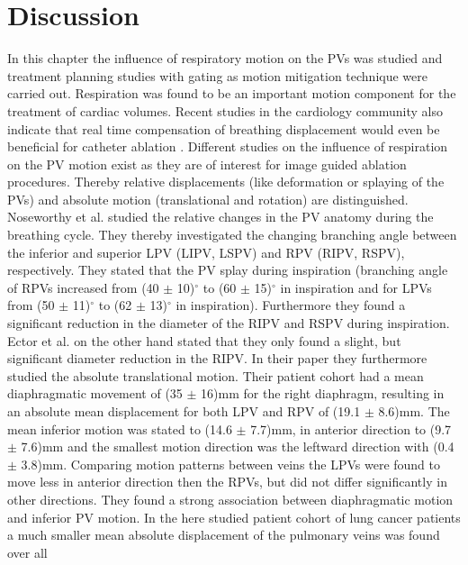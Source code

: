 \documentclass[type=dr, dr=rernat, accentcolor=tud7b,colorbacktitle, bigchapter, openright, twoside, 12pt ]{tudthesis}
\begin{document}
\section{Discussion}
In this chapter the influence of respiratory motion on the PVs was studied and treatment planning studies with gating as motion 
mitigation technique were carried out. Respiration was found to be an important motion component for the treatment of cardiac volumes. 
Recent studies in the cardiology community also indicate that real time compensation of breathing displacement 
would even be beneficial for catheter ablation \cite{Kum12} \cite{Frie12}.\newline
\newline
Different studies on the influence of respiration on the PV motion exist as they are of interest for image guided ablation procedures. 
Thereby relative displacements (like deformation or splaying of the PVs) and absolute motion (translational and rotation) are distinguished. 
Noseworthy et al. \cite{Nos05} studied the relative changes in the PV anatomy during the breathing cycle. They thereby investigated the changing 
branching angle between the inferior and superior LPV (LIPV, LSPV) and RPV (RIPV, RSPV), respectively. They stated that the PV splay during 
inspiration (branching angle of RPVs increased from (40 $\pm$ 10)$^\circ$ to (60 $\pm$ 15)$^\circ$ in inspiration and for LPVs 
from (50 $\pm$ 11)$^\circ$ to (62 $\pm$ 13)$^\circ$ in inspiration). Furthermore they found a significant reduction in 
the diameter of the RIPV and RSPV during inspiration. Ector et al. \cite{Ect08} on the other hand stated that they only found a slight, 
but significant diameter reduction in the RIPV. In their paper they furthermore studied the absolute translational motion. 
Their patient cohort had a mean diaphragmatic movement of (35 $\pm$ 16)mm for the right diaphragm, resulting in an absolute mean displacement 
for both LPV and RPV of (19.1 $\pm$ 8.6)mm. The mean inferior motion was stated 
to (14.6 $\pm$ 7.7)mm, in anterior direction to (9.7 $\pm$ 7.6)mm and the smallest motion direction was the leftward direction with 
(0.4 $\pm$ 3.8)mm. Comparing motion patterns between veins the LPVs were found to move less in anterior direction then the RPVs, but did 
not differ significantly in other directions. They found a strong association between diaphragmatic motion and inferior PV motion.\newline
\newline
In the here studied patient cohort of lung cancer patients a much smaller mean absolute displacement of the pulmonary veins was found over all 
\end{document}
